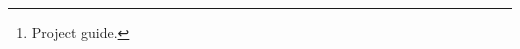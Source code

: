 \author{
  Arvind C R \\
  PES University\\
  \texttt{arvindcr4@gmail.com} \\
  \And
  Ramesh Prakash Guledgudd\thanks{Project guide.} \\
  PES University\\
  \texttt{rameshpg@pes.edu} \\
}
